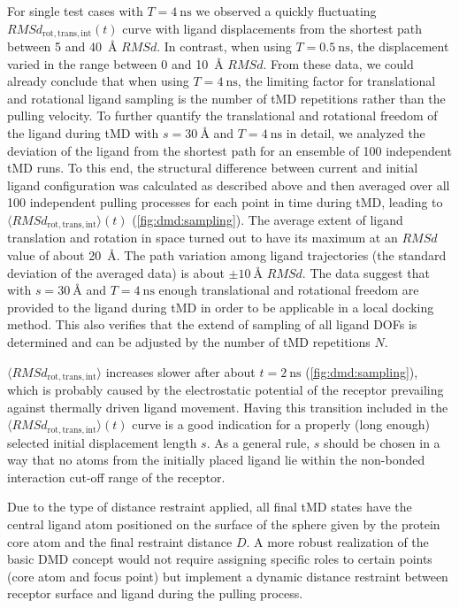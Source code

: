 For single test cases with $T=\SI{4}{\nano\second}$ we observed a quickly
fluctuating $RMSd_{\mathrm{rot,trans,int}}(t)$ curve with ligand displacements
from the shortest path between 5 and \SI{40}{\angstrom} $RMSd$. In contrast,
when using $T=\SI{0.5}{\nano\second}$, the displacement varied in the range
between 0 and \SI{10}{\angstrom} $RMSd$. From these data, we could already
conclude that when using $T=\SI{4}{\nano\second}$, the limiting factor for
translational and rotational ligand sampling is the number of tMD repetitions
rather than the pulling velocity. To further quantify the translational and
rotational freedom of the ligand during tMD with $s=\SI{30}{\angstrom}$ and
$T=\SI{4}{\nano\second}$ in detail, we analyzed the deviation of the ligand from
the shortest path for an ensemble of 100 independent tMD runs. To this end, the
structural difference between current and initial ligand configuration was
calculated as described above and then averaged over all 100 independent pulling
processes for each point in time during tMD, leading to $\langle
RMSd_{\mathrm{rot,trans,int}}\rangle(t)$ (\cref{fig:dmd:sampling}). The average
extent of ligand translation and rotation in space turned out to have its
maximum at an $RMSd$ value of about \SI{20}{\angstrom}. The path variation among
ligand trajectories (the standard deviation of the averaged data) is about
$\pm\SI{10}{\angstrom}$ $RMSd$. The data suggest that with
$s=\SI{30}{\angstrom}$ and $T=\SI{4}{\nano\second}$ enough translational and
rotational freedom are provided to the ligand during tMD in order to be
applicable in a local docking method. This also verifies that the extend of
sampling of all ligand DOFs is determined and can be adjusted by the number of
tMD repetitions $N$.

$\langle RMSd_{\mathrm{rot,trans,int}}\rangle$ increases slower after about
$t=\SI{2}{\nano\second}$ (\cref{fig:dmd:sampling}), which is probably caused by
the electrostatic potential of the receptor prevailing against thermally driven
ligand movement. Having this transition included in the $\langle
RMSd_{\mathrm{rot,trans,int}}\rangle(t)$ curve is a good indication for a
properly (long enough) selected initial displacement length $s$. As a general
rule, $s$ should be chosen in a way that no atoms from the initially placed
ligand lie within the non-bonded interaction cut-off range of the receptor.

Due to the type of distance restraint applied, all final tMD states have the
central ligand atom positioned on the surface of the sphere given by the protein
core atom and the final restraint distance $D$. A more robust realization of the
basic DMD concept would not require assigning specific roles to certain points
(core atom and focus point) but implement a dynamic distance restraint between
receptor surface and ligand during the pulling process.

